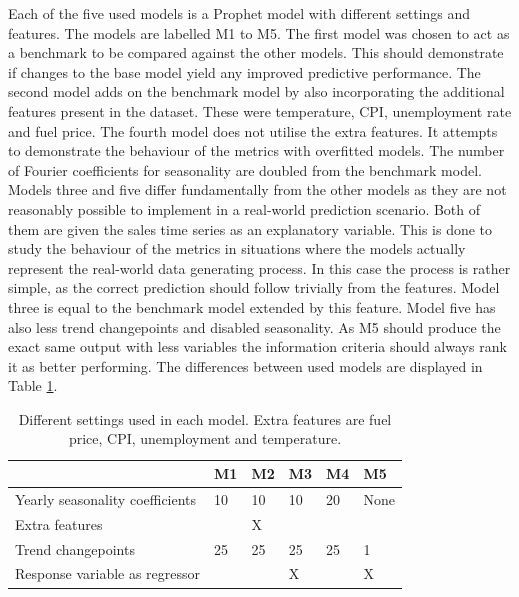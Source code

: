 \documentclass[english, 12pt, a4paper, sci, utf8, a-1b, online]{aaltothesis}
\begin{document}
Each of the five used models is a Prophet model with different settings and features. The models are labelled M1 to M5. The first model was chosen to act as a benchmark to be compared against the other models. This should demonstrate if changes to the base model yield any improved predictive performance. The second model adds on the benchmark model by also incorporating the additional features present in the dataset. These were temperature, CPI, unemployment rate and fuel price. The fourth model does not utilise the extra features. It attempts to demonstrate the behaviour of the metrics with overfitted models. The number of Fourier coefficients for seasonality are doubled from the benchmark model. Models three and five differ fundamentally from the other models as they are not reasonably possible to implement in a real-world prediction scenario. Both of them are given the sales time series as an explanatory variable. This is done to study the behaviour of the metrics in situations where the models actually represent the real-world data generating process. In this case the process is rather simple, as the correct prediction should follow trivially from the features. Model three is equal to the benchmark model extended by this feature. Model five has also less trend changepoints and disabled seasonality. As M5 should produce the exact same output with less variables the information criteria should always rank it as better performing. The differences between used models are displayed in Table \ref{tab:model_settings}.


\begin{table}[]
	\caption{\label{tab:model_settings} Different settings used in each model. Extra features are fuel price, CPI, unemployment and temperature.}
	\begin{tabular}{|l|l|l|l|l|l|}
		\hline
																		& \textbf{M1} & \textbf{M2} & \textbf{M3} & \textbf{M4} & \textbf{M5} \\ \hline
		Yearly seasonality coefficients & 10          & 10          & 10          & 20          & None        \\ \hline
		Extra features                  &             & X           &             &             &             \\ \hline
		Trend changepoints              & 25          & 25          & 25          & 25          & 1           \\ \hline
		Response variable as regressor  &             &             & X           &             & X           \\ \hline
		\end{tabular}
\end{table}
\end{document}
